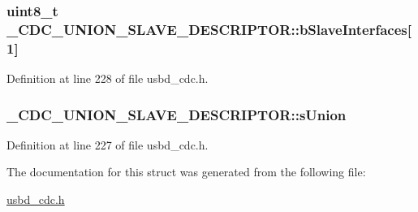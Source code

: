 \subsubsection[{\texorpdfstring{b\+Slave\+Interfaces}{bSlaveInterfaces}}]{\setlength{\rightskip}{0pt plus 5cm}uint8\+\_\+t \+\_\+\+C\+D\+C\+\_\+\+U\+N\+I\+O\+N\+\_\+S\+L\+A\+V\+E\+\_\+\+D\+E\+S\+C\+R\+I\+P\+T\+O\+R\+::b\+Slave\+Interfaces\mbox{[}1\mbox{]}}\hypertarget{struct__CDC__UNION__1SLAVE__DESCRIPTOR_a4a4b8383cd96d9ba6fa83b35bb32c94b}{}\label{struct__CDC__UNION__1SLAVE__DESCRIPTOR_a4a4b8383cd96d9ba6fa83b35bb32c94b}


Definition at line 228 of file usbd\+\_\+cdc.\+h.

\subsubsection[{\texorpdfstring{s\+Union}{sUnion}}]{ \+\_\+\+C\+D\+C\+\_\+\+U\+N\+I\+O\+N\+\_\+S\+L\+A\+V\+E\+\_\+\+D\+E\+S\+C\+R\+I\+P\+T\+O\+R\+::s\+Union}\hypertarget{struct__CDC__UNION__1SLAVE__DESCRIPTOR_a80ee9f0210ba596bfbeef771955c26a6}{}\label{struct__CDC__UNION__1SLAVE__DESCRIPTOR_a80ee9f0210ba596bfbeef771955c26a6}


Definition at line 227 of file usbd\+\_\+cdc.\+h.



The documentation for this struct was generated from the following file\+:\begin{DoxyCompactItemize}
\item 
\hyperlink{usbd__cdc_8h}{usbd\+\_\+cdc.\+h}\end{DoxyCompactItemize}
